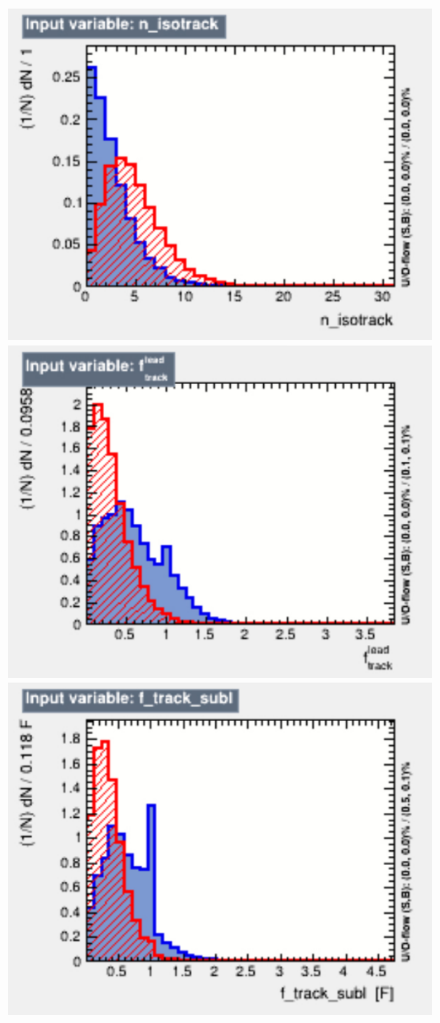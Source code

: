 \clearpage{}
\begin{figure}[th!]
    \centering
    \setlength{\individualPlotWidth}{0.3\textwidth}
    \includegraphics[width=\individualPlotWidth]{Assets/Plots/DiTau/BDT_vars/n_isotracks.pdf}
    \includegraphics[width=\individualPlotWidth]{Assets/Plots/DiTau/BDT_vars/f_lead_track.pdf}
    \includegraphics[width=\individualPlotWidth]{Assets/Plots/DiTau/BDT_vars/f_subl_track.pdf}

\end{figure}
